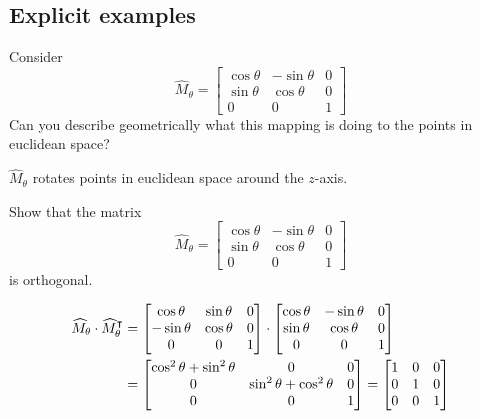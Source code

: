\documentclass[newpage,hints,handout,12pt,noauthor,nooutcomes]{ximera}
\begin{document}
\subsection{Explicit examples}


\begin{problem}
  Consider
  \[
  \hat{M}_\theta=\begin{bmatrix}
  \cos\theta & -\sin\theta & 0\\
  \sin\theta & \cos\theta & 0\\
  0 & 0 & 1
  \end{bmatrix}
  \]
  Can you describe geometrically what this mapping is doing
  to the points in euclidean space?


\begin{freeResponse}
$\hat{M}_\theta$ rotates points in euclidean space around the $z$-axis. 
\end{freeResponse}
\end{problem}


\begin{problem}
\label{14} Show that the matrix%
\[
\hat{M}_\theta=\begin{bmatrix}
\cos\theta & -\sin\theta & 0\\
\sin\theta & \cos\theta & 0\\
0 & 0 & 1
\end{bmatrix}
\]
is orthogonal. 

\begin{freeResponse}
\begin{align*}
\widehat{M}_\theta \cdot \widehat{M}_\theta^\intercal 
	&= \begin{bmatrix}
	\cos\theta & \sin\theta & 0 \\
	-\sin\theta & \cos\theta & 0 \\
	0 & 0 & 1
	\end{bmatrix} \cdot
	\begin{bmatrix}
	\cos\theta & -\sin\theta & 0 \\
	\sin\theta & \cos\theta & 0 \\
	0 & 0 & 1
	\end{bmatrix} \\
	&= \begin{bmatrix}
	\cos^{2}\theta + \sin^{2} \theta & 0 & 0 \\
	0 &  \sin^{2} \theta + \cos^{2}\theta  & 0 \\
	0 & 0 & 1
	\end{bmatrix}
	=  \begin{bmatrix}
	1 & 0 & 0 \\
	0 & 1  & 0 \\
	0 & 0 & 1
	\end{bmatrix}
\end{align*}
\end{freeResponse}
\end{problem}
\end{document}
